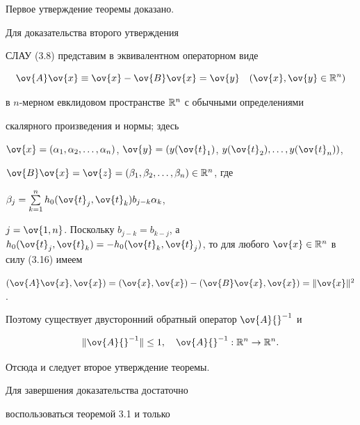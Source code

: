 Первое утверждение теоремы доказано. 





Для доказательства второго утверждения


СЛАУ (3.8) представим в эквивалентном операторном виде


\begin{equation}


\ov{A}\ov{x}\equiv \ov{x}-\ov{B}\ov{x}=


\ov{y} \quad (\ov{x}, \ov{y}\in \Bbb{R}^n)


\end{equation}


в $n$-мерном евклидовом пространстве $\Bbb{R}^n$ с обычными определениями


скалярного произведения и нормы; здесь


$\ov{x}=(\alpha_1,\alpha_2,


\dotsc ,\alpha_n)$, $\ov{y}=(y(\ov{t}_1)$, $y(\ov{t}_2),


\dotsc ,y(\ov{t}_n))$,


$\ov{B}\ov{x}=\ov{z}=(\beta_1,\beta_2,\dotsc ,\beta_n)


\in \Bbb{R}^n$, где


$\beta_j=\sum\limits_{k=1}^nh_0(\ov{t}_j,\ov{t}_k)b_{j-k}\alpha_k$,


$j=\ov{1,n}$. Поскольку $b_{j-k}=b_{k-j}$, а $h_0(\ov{t}_j,\ov{t}_k) =


-h_0(\ov{t}_k,\ov{t}_j)$, то для любого $\ov{x}\in


\Bbb{R}^n$ в силу (3.16) имеем


$(\ov{A}\ov{x},\ov{x})=(\ov{x},\ov{x})-


(\ov{B}\ov{x},\ov{x})=\|\ov{x}\|^2$.


Поэтому существует двусторонний обратный оператор $\ov{A}{}^{-1}$ и


\begin{equation}


\|\ov{A}{}^{-1}\|\leq 1,\quad \ov{A}{}^{-1}:\Bbb{R}^n


\rightarrow \Bbb{R}^n .


\end{equation}


Отсюда и следует второе утверждение теоремы.





Для завершения доказательства достаточно 


воспользоваться теоремой 3.1 и только


